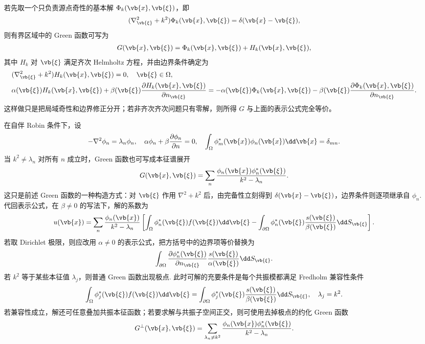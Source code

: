 若先取一个只负责源点奇性的基本解 \(\Phi_k(\vb{x},\vb{\xi})\)，即
\begin{align*}
	(\nabla_{\vb{\xi}}^2+k^2)\Phi_k(\vb{x},\vb{\xi})=\delta(\vb{x}-\vb{\xi}),
\end{align*}
则有界区域中的 Green 函数可写为
\begin{align*}
	G(\vb{x},\vb{\xi})=\Phi_k(\vb{x},\vb{\xi})+H_k(\vb{x},\vb{\xi}),
\end{align*}
其中 \(H_k\) 对 \(\vb{\xi}\) 满足齐次 Helmholtz 方程，并由边界条件确定为
\begin{align*}
	&(\nabla_{\vb{\xi}}^2+k^2)H_k(\vb{x},\vb{\xi})=0,\quad \vb{\xi}\in\Omega,\\
	&\alpha(\vb{\xi})H_k(\vb{x},\vb{\xi})+\beta(\vb{\xi})\frac{\partial H_k(\vb{x},\vb{\xi})}{\partial n_{\vb{\xi}}}
	=-\alpha(\vb{\xi})\Phi_k(\vb{x},\vb{\xi})-\beta(\vb{\xi})\frac{\partial \Phi_k(\vb{x},\vb{\xi})}{\partial n_{\vb{\xi}}}.
\end{align*}
这样做只是把局域奇性和边界修正分开；若非齐次齐次问题只有零解，则所得 \(G\) 与上面的表示公式完全等价。

在自伴 Robin 条件下，设
\begin{align*}
	-\nabla^2\phi_n=\lambda_n\phi_n,
	\quad
	\alpha\phi_n+\beta\frac{\partial\phi_n}{\partial n}=0,
	\quad
	\int_\Omega \phi_m^*(\vb{x})\phi_n(\vb{x})\dd\vb{x}=\delta_{mn}.
\end{align*}
当 \(k^2\neq\lambda_n\) 对所有 \(n\) 成立时，Green 函数也可写成本征谱展开
\begin{align*}
	G(\vb{x},\vb{\xi})=\sum_n\frac{\phi_n(\vb{x})\phi_n^*(\vb{\xi})}{k^2-\lambda_n}.
\end{align*}
这只是前述 Green 函数的一种构造方式：对 \(\vb{\xi}\) 作用 \(\nabla^2+k^2\) 后，由完备性立刻得到 \(\delta(\vb{x}-\vb{\xi})\)，边界条件则逐项继承自 \(\phi_n\). 代回表示公式，在 \(\beta\neq0\) 的写法下，解的系数为
\begin{align*}
	u(\vb{x})=\sum_n\frac{\phi_n(\vb{x})}{k^2-\lambda_n}
	\left[\int_\Omega \phi_n^*(\vb{\xi})f(\vb{\xi})\dd\vb{\xi}
	-\int_{\partial\Omega}\phi_n^*(\vb{\xi})\frac{s(\vb{\xi})}{\beta(\vb{\xi})}\dd S_{\vb{\xi}}\right].
\end{align*}
若取 Dirichlet 极限，则应改用 \(\alpha\neq0\) 的表示公式，把方括号中的边界项等价替换为
\begin{align*}
	\int_{\partial\Omega}\frac{\partial\phi_n^*(\vb{\xi})}{\partial n_{\vb{\xi}}}\frac{s(\vb{\xi})}{\alpha(\vb{\xi})}\dd S_{\vb{\xi}}.
\end{align*}
若 \(k^2\) 等于某些本征值 \(\lambda_j\)，则普通 Green 函数出现极点. 此时可解的充要条件是每个共振模都满足 Fredholm 兼容性条件
\begin{align*}
	\int_\Omega \phi_j^*(\vb{\xi})f(\vb{\xi})\dd\vb{\xi}
	=\int_{\partial\Omega}\phi_j^*(\vb{\xi})\frac{s(\vb{\xi})}{\beta(\vb{\xi})}\dd S_{\vb{\xi}},
	\quad \lambda_j=k^2.
\end{align*}
若兼容性成立，解还可任意叠加共振本征函数；若要求解与共振子空间正交，则可使用去掉极点的约化 Green 函数
\begin{align*}
	G^\perp(\vb{x},\vb{\xi})=
	\sum_{\lambda_n\neq k^2}\frac{\phi_n(\vb{x})\phi_n^*(\vb{\xi})}{k^2-\lambda_n}.
\end{align*}

